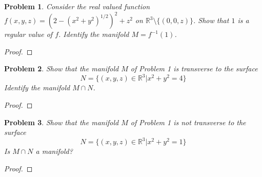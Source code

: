 \documentclass[10pt]{article}
\newcommand{\sk}{\vskip10mm}
\newcommand{\bb}[1]{\mathbb{#1}}
\theoremstyle{plain}
\newtheorem{problem}{Problem}
\theoremstyle{remark}
\begin{document}
\begin{problem}
  Consider the real valued function $f(x,y,z)=(2-(x^2+y^2)^{1/2})^2+z^2$ on $\bb{R}^3\setminus\{(0,0,z)\}$. Show that $1$ is a regular value of $f$. Identify the manifold $M=f^{-1}(1)$.
\end{problem}

\begin{proof}
  
\end{proof}

\sk

\begin{problem}
  Show that the manifold $M$ of Problem 1 is transverse to the surface
  \[
    N=\{(x,y,z)\in\bb{R}^3|x^2+y^2=4\}
  \]
  Identify the manifold $M\cap N$.
\end{problem}

\begin{proof}
  
\end{proof}

\sk

\begin{problem}
  Show that the manifold $M$ of Problem 1 is not transverse to the surface
  \[
    N=\{(x,y,z)\in\bb{R}^3|x^2+y^2=1\}
  \]
  Is $M\cap N$ a manifold?
\end{problem}

\begin{proof}
  
\end{proof}

\end{document}
